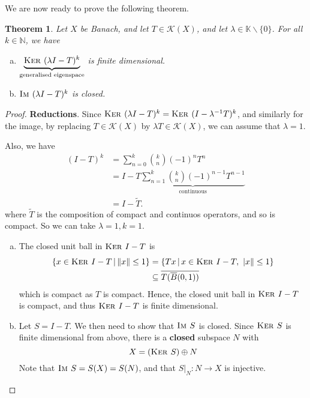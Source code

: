 \documentclass[10pt, oneside, reqno]{amsart}
\theoremstyle{plain}%
\newtheorem{thm}{Theorem}[section]
\theoremstyle{definition}
\theoremstyle{remark}
\newcommand{\given}{ \, | \,}
\newcommand{\K}{\mathbb{K}}
\newcommand{\N}{\mathbb{N}}
\newcommand{\im}{\textsc{Im\ }}
\renewcommand{\ker}{\textsc{Ker\ }}
\begin{document}
We are now ready to prove the following theorem.

\begin{thm}
    Let $X$ be Banach, and let $T \in \mathcal K(X)$, and let $\lambda \in \K \backslash \{ 0 \}$.  For all $k \in \N$, we have \begin{enumerate}[(a)]
        \item $\underbrace{\ker(\lambda I - T)^k}_{\text{generalised eigenspace}}$ is finite dimensional.
        \item $\im(\lambda I - T)^k$ is closed.   
    \end{enumerate}
\end{thm}
\begin{proof}
    \textbf{Reductions}.  Since $\ker(\lambda I - T)^k = \ker(I - \lambda^{-1}T)^k$, and similarly for the image, by replacing $T \in \mathcal K(X)$ by $\lambda T \in \mathcal K(X)$, we can assume that $\lambda = 1$.
    
    Also, we have \begin{align*}
        (I - T)^k   &= \sum_{n=0}^k {k \choose n} (-1)^n T^n \\
                    &= I - T \underbrace{\sum_{n = 1}^k {k \choose n} (-1)^{n-1} T^{n-1}}_\text{continuous}  \\
                    &= I - \tilde T.
    \end{align*} where $\tilde T$ is the composition of compact and continuos operators, and so is compact.  So we can take $\lambda = 1, k = 1$.  
    
    \begin{enumerate}[(a)]
        \item The closed unit ball in $\ker I - T$ is \begin{align*}
        \{ x \in \ker I - T \given \| x \| \leq 1 \} &= \{ Tx \given x \in \ker I - T, \ | x \| \leq 1 \} \\
        &\subseteq \overline{T (\overline B(0, 1))}
        \end{align*} which is compact as $T$ is compact.  Hence, the closed unit ball in $\ker I - T$ is compact, and thus $\ker I - T$ is finite dimensional.
        \item Let $S = I - T$.  We then need to show that $\im S$ is closed.  Since $\ker S$ is finite dimensional from above, there is a \textbf{closed} subspace $N$ with \[
            X = (\ker S) \oplus N
        \]  Note that $\im S = S(X) = S(N)$, and that $S |_N : N \rightarrow X$ is injective. 
        

\end{enumerate}
\end{proof}
\end{document}
